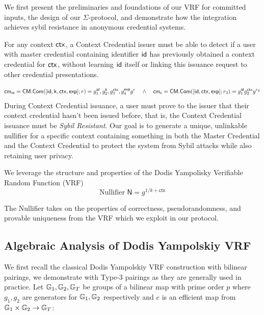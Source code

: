 We first present the preliminaries and foundations of our VRF for committed inputs, the design of our $\Sigma$-protocol, and demonstrate how the integration achieves sybil resistance in anonymous credential systems.

\begin{definition}
For any context $\mathsf{ctx}$, a Context Credential issuer must be able to detect if a user with master credential containing identifier $\mathsf{id}$ has previously obtained a context credential for $\mathsf{ctx}$, without learning $\mathsf{id}$ itself or linking this issuance request to other credential presentations.
\end{definition}

\[
\mathsf{cm_m} = \mathsf{CM.Com}([\mathsf{id}, \mathsf{k}, \mathsf{ctx}, \mathsf{exp}]; r) = g_1^{\mathsf{id}}, g_2^{\mathsf{k}}, g_3^{\mathsf{ctx}}, g_4^{\mathsf{exp}} g^r \quad \wedge \quad \mathsf{cm_c} = \mathsf{CM.Com}([\mathsf{id}, \mathsf{ctx}, \mathsf{exp}]; r_2) = g_1^{\mathsf{id}}g_2^{\mathsf{ctx}}g^{r_2}
\]
During Context Credential issuance, a user must prove to the issuer that their context credential hasn't been issued before, that is, the Context Credential issuance must be \emph{Sybil Resistant}. Our goal is to generate a unique, unlinkable nullifier for a specific context containing something in both the Master Credential and the Context Credential to protect the system from Sybil attacks while also retaining user privacy.

We leverage the structure and properties of the Dodis Yampolisky Verifiable Random Function (VRF)
\[
\text{Nullifier } \textsf{N} = g^{1/k + \textsf{ctx}}
\]

The Nullifier takes on the properties of correctness, pseudorandomness, and provable uniqueness from the VRF which we exploit in our protocol.




\subsection{Algebraic Analysis of Dodis Yampolskiy VRF}
We first recall the classical Dodis Yampolskiy VRF construction with bilinear pairings, we demonstrate with Type-3 pairings as they are generally used in practice. Let $\mathbb{G}_1, \mathbb{G}_2, \mathbb{G}_T$ be groups of a bilinear map with prime order $p$ where $g_1, g_2$ are generators for $\mathbb{G}_1, \mathbb{G}_2$ respectively and $e$ is an efficient map from $\mathbb{G}_1 \times \mathbb{G}_2 \to \mathbb{G}_T$:

    
